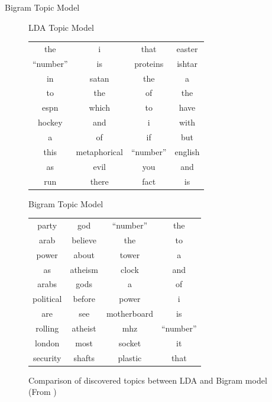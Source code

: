 \documentclass[10pt, svgnames]{beamer}
\begin{document}
\begin{frame}{Bigram Topic Model}
	\begin{figure}
	\begin{minipage}{0.5\linewidth}
		\begin{center}
			LDA Topic Model
		\end{center}
		\begin{center}
			\tiny{
			\begin{tabular}{|c|c|c|c|}
				\hline
				the   &      i    &    that &  easter\\
				``number'' &     is   &   proteins & ishtar\\
				in   &   satan   &     the  &     a\\
				to   &    the     &     of  &    the\\
				espn   &   which     &    to  &   have\\
				hockey  &    and      &     i  &   with\\
				a   &     of      &    if   &   but\\
				this & metaphorical& ``number'' &english\\
				as  &     evil     &   you  &    and\\
				run   &    there    &   fact   &    is\\
				\hline
			\end{tabular}}
		\end{center}
	\end{minipage}
	\begin{minipage}{0.45\linewidth}
		\begin{center}
			Bigram Topic Model
		\end{center}
		\begin{center}
			\tiny{
			\begin{tabular}{|c|c|c|c|}
				\hline
				party  &   god   & ``number''  &    the\\
				arab &  believe  &   the    &     to\\
				power &   about   &  tower   &     a\\
				as  &  atheism  &  clock   &    and\\
				arabs &    gods   &    a     &     of\\
				political & before  &  power    &     i\\
				are   &   see & motherboard  &   is\\
				rolling & atheist &    mhz   &  ``number''\\
				london  &   most  &  socket  &     it\\
				security &  shafts &  plastic  &  that\\
				\hline
			\end{tabular}}
		\end{center}
	\end{minipage}
	\caption{Comparison of discovered topics between LDA and Bigram model (From
	\cite{btm})}
	\label{fig:bigram_compare}
\end{figure}
\end{frame}
\end{document}
